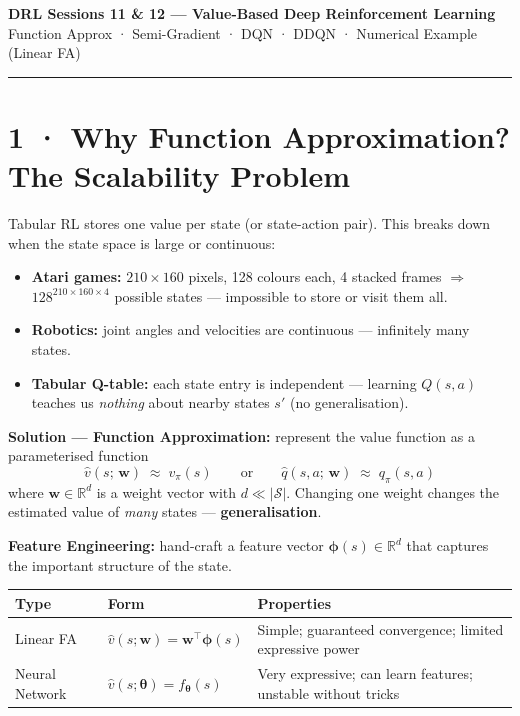 \documentclass[11pt,a4paper]{article}
\begin{document}
\begin{center}
  {\large\bfseries DRL Sessions 11 \& 12 — Value-Based Deep Reinforcement Learning}\\[2pt]
  {\small Function Approx · Semi-Gradient · DQN · DDQN · Numerical Example (Linear FA)}
\end{center}
\hrule\vspace{6pt}

\section*{1 · Why Function Approximation? The Scalability Problem}

\begin{tcolorbox}[defn={The Problem with Tabular Methods}]
Tabular RL stores one value per state (or state-action pair).
This breaks down when the state space is large or continuous:
\begin{itemize}
  \item \textbf{Atari games:} $210 \times 160$ pixels, 128 colours each, 4 stacked frames
    $\Rightarrow$ $128^{210 \times 160 \times 4}$ possible states — impossible to store or visit them all.
  \item \textbf{Robotics:} joint angles and velocities are continuous — infinitely many states.
  \item \textbf{Tabular Q-table:} each state entry is independent — learning $Q(s, a)$ teaches us
    \emph{nothing} about nearby states $s'$ (no generalisation).
\end{itemize}
\end{tcolorbox}

\textbf{Solution — Function Approximation:} represent the value function as a parameterised function
\[
  \hat{v}(s;\,\mathbf{w}) \;\approx\; v_\pi(s)
  \qquad\text{or}\qquad
  \hat{q}(s,a;\,\mathbf{w}) \;\approx\; q_\pi(s,a)
\]
where $\mathbf{w} \in \mathbb{R}^d$ is a weight vector with $d \ll |\mathcal{S}|$.
Changing one weight changes the estimated value of \emph{many} states — \textbf{generalisation}.

\textbf{Feature Engineering:} hand-craft a feature vector $\boldsymbol{\phi}(s) \in \mathbb{R}^d$
that captures the important structure of the state.

\begin{center}\small
\begin{tabular}{p{3cm}p{4.5cm}p{6cm}}
\toprule
\textbf{Type} & \textbf{Form} & \textbf{Properties} \\
\midrule
Linear FA & $\hat{v}(s;\mathbf{w}) = \mathbf{w}^\top\boldsymbol{\phi}(s)$ & Simple; guaranteed convergence; limited expressive power \\
Neural Network & $\hat{v}(s;\boldsymbol{\theta}) = f_{\boldsymbol{\theta}}(s)$ & Very expressive; can learn features; unstable without tricks \\
\bottomrule
\end{tabular}
\end{center}
\end{document}

